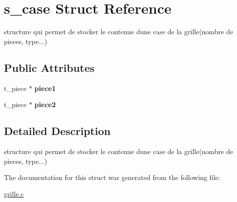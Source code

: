 \hypertarget{structs__case}{}\section{s\+\_\+case Struct Reference}
\label{structs__case}


structure qui permet de stocker le contenue d\textquotesingle{}une case de la grille(nombre de pieces, type...)  


\subsection*{Public Attributes}
\begin{DoxyCompactItemize}
\item 
\mbox{\label{structs__case_af0face97112a4c273ff1ceaa48474da6}} 
t\+\_\+piece $\ast$ {\bfseries piece1}
\item 
\mbox{\label{structs__case_ad33ef17d07997b161c13cae81c014451}} 
t\+\_\+piece $\ast$ {\bfseries piece2}
\end{DoxyCompactItemize}


\subsection{Detailed Description}
structure qui permet de stocker le contenue d\textquotesingle{}une case de la grille(nombre de pieces, type...) 

The documentation for this struct was generated from the following file\+:\begin{DoxyCompactItemize}
\item 
\mbox{\hyperlink{grille_8c}{grille.\+c}}\end{DoxyCompactItemize}
